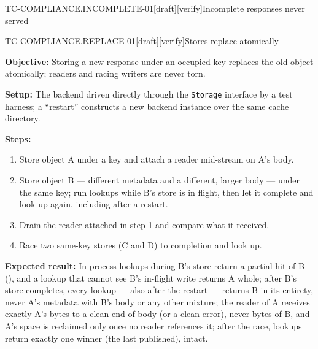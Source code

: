 \begin{requirement}{TC-COMPLIANCE.INCOMPLETE-01}[draft][verify]{Incomplete responses never served}


\end{requirement}

\begin{requirement}{TC-COMPLIANCE.REPLACE-01}[draft][verify]{Stores replace atomically}


  \textbf{Objective:} Storing a new response under an occupied key replaces the
  old object atomically; readers and racing writers are never torn.

  \textbf{Setup:} The backend driven directly through the \texttt{Storage}
  interface by a test harness; a ``restart'' constructs a new backend instance
  over the same cache directory.

  \textbf{Steps:}
  \begin{enumerate}
    \item Store object A under a key and attach a reader mid-stream on A's body.
    \item Store object B --- different metadata and a different, larger body ---
      under the same key; run lookups while B's store is in flight, then let it
      complete and look up again, including after a restart.
    \item Drain the reader attached in step 1 and compare what it received.
    \item Race two same-key stores (C and D) to completion and look up.
  \end{enumerate}

  \textbf{Expected result:} In-process lookups during B's store return a
  partial hit of B (), and a lookup that
  cannot see B's in-flight write returns A whole; after B's
  store completes, every lookup --- also after the restart --- returns B in its
  entirety, never A's metadata with B's body or any other mixture; the reader
  of A receives exactly A's bytes to a clean end of body (or a clean error),
  never bytes of B, and A's space is reclaimed only once no reader references
  it; after the race, lookups return exactly one winner (the last published),
  intact.



\end{requirement}

